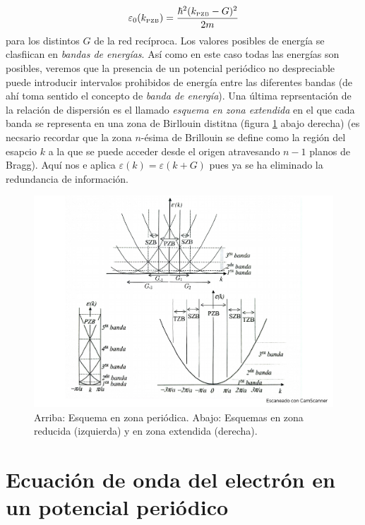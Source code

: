 \begin{equation}
    \varepsilon_0 (k_{\text{{\tiny PZB}}}) = \frac{\hbar^2 (k_{\text{{\tiny PZB}}}-G)^2}{2m}
\end{equation}
para los distintos $G$ de la red recíproca. Los valores posibles de energía se clasfiican en \textit{bandas de energías}. Así como en este caso todas las energías son posibles, veremos que la presencia de un potencial periódico no despreciable puede introducir intervalos prohibidos de energía entre las diferentes bandas (de ahí toma sentido el concepto de \textit{banda de energía}). Una última reprsentación de la relación de dispersión es el llamado \textit{esquema en zona extendida} en el que cada banda se representa en una zona de Birllouin distitna (figura \ref{Fig:07-01} abajo derecha) (es necsario recordar que la zona $n$-ésima de Brillouin se define como la región del esapcio $k$ a la que se puede acceder desde el origen atravesando $n-1$ planos de Bragg). Aquí nos e aplica $\varepsilon(k) = \varepsilon(k+G)$ pues ya se ha eliminado la redundancia de información.

\begin{figure}[h!] \centering
    \includegraphics[scale=0.5]{Cuerpo/Ch_07/Fotos libro 1.pdf}
    \caption{Arriba: Esquema en zona periódica. Abajo: Esquemas en zona reducida (izquierda) y en zona extendida (derecha).}
    \label{Fig:07-01}
\end{figure}    

\section{Ecuación de onda del electrón en un potencial periódico}

